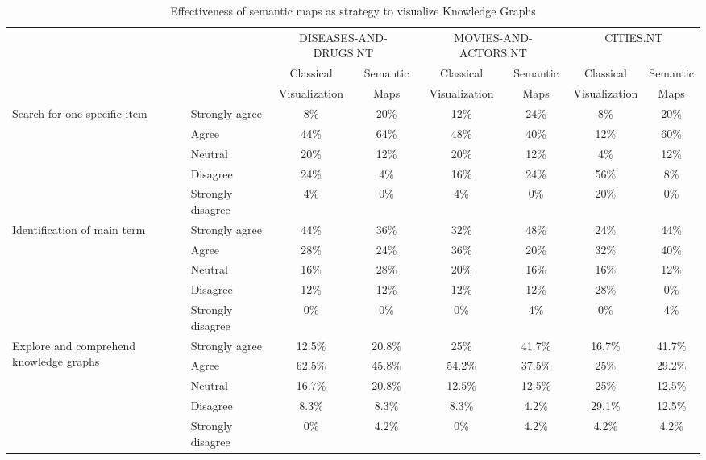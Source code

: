 \documentclass{ieeeaccess}
\begin{document}
\begin{table}[h!]
  \caption{Effectiveness of semantic maps as strategy to visualize Knowledge Graphs}
  \label{tab:Effectiveness}
  \begin{tabular}{llcccccc}
    \toprule
     & & \multicolumn{2}{c}{
     \footnotesize DISEASES-AND-DRUGS.NT} &
     \multicolumn{2}{c}{
     \footnotesize MOVIES-AND-ACTORS.NT} &
     \multicolumn{2}{c}{
     \footnotesize CITIES.NT} \\
     & & 
     \footnotesize Classical &
     \footnotesize Semantic  & 
     \footnotesize Classical &
     \footnotesize Semantic  &  
     \footnotesize Classical &
     \footnotesize Semantic  \\
     & & 
     \footnotesize Visualization &
     \footnotesize Maps  & 
     \footnotesize Visualization &
     \footnotesize Maps  &  
     \footnotesize Visualization &
     \footnotesize Maps  \\
    \midrule
    \multirow{5}{4em}{Search for one specific item}
    & Strongly agree &      8\% &       20\% &  12\% &    24\% &   8\% &    20\%  \\
    & Agree &               44\% &      64\% &  48\% &    40\% &   12\% &   60\% \\
    & Neutral &             20\% &      12\% &  20\% &    12\% &   4\% &    12\% \\
    & Disagree &            24\% &      4\% &   16\% &    24\% &   56\% &   8\% \\
    & Strongly disagree &   4\% &       0\%  &  4\% &     0\% &    20\% &   0\% \\
    \midrule
    \multirow{5}{4em}{Identification of main term}  
    & Strongly agree &      44\% &    36\% &      32\% &   48\% &  24\% &   44\% \\
    & Agree &               28\% &    24\% &      36\% &   20\% &  32\% &   40\% \\
    & Neutral &             16\% &    28\% &      20\% &   16\% &  16\% &   12\% \\
    & Disagree &            12\% &    12\% &      12\% &   12\% &  28\% &   0\% \\
    & Strongly disagree &   0\% &     0\% &       0\% &    4\% &   0\% &    4\% \\
    \midrule
    \multirow{5}{8em}{Explore and comprehend knowledge graphs}
    & Strongly agree &      12.5\% &    20.8\% &      25\% &      41.7\% &    16.7\% &  41.7\% \\
    & Agree & 	            62.5\% &    45.8\% &      54.2\% &    37.5\% &    25\% &    29.2\% \\
    & Neutral &             16.7\% &    20.8\% &      12.5\% &    12.5\% &    25\% &    12.5\% \\
    & Disagree &            8.3\% &     8.3\% &       8.3\% &     4.2\% &     29.1\% &  12.5\% \\
    & Strongly disagree &   0\% &       4.2\% &       0\% &       4.2\% &     4.2\% &   4.2\% \\
  \bottomrule
\end{tabular}
\end{table}
\end{document}
